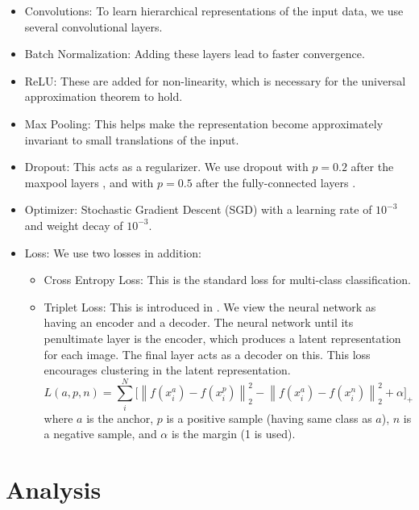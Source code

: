 \documentclass{article}
\newcommand{\norm}[1]{\left\lVert#1\right\rVert}
\begin{document}
\begin{sloppypar}
        \begin{itemize}
            \item Convolutions: To learn hierarchical representations of the input data, we use several convolutional layers.
            \item Batch Normalization: Adding these layers lead to faster convergence.
            \item ReLU: These are added for non-linearity, which is necessary for the universal approximation theorem to hold.
            \item Max Pooling: This helps make the representation become approximately invariant to small translations of the input.
            \item Dropout: This acts as a regularizer. We use dropout with $p=0.2$ after the maxpool layers \cite{dropout_analysis}, and with $p=0.5$ after the fully-connected layers \cite{dropout_hinton}.
            \item Optimizer: Stochastic Gradient Descent (SGD) with a learning rate of $10^{-3}$ and weight decay of $10^{-3}$.
            \item Loss: We use two losses in addition:
                \begin{itemize}
                    \item Cross Entropy Loss: This is the standard loss for multi-class classification.
                    \item Triplet Loss: This is introduced in \cite{facenet}. We view the neural network as having an encoder and a decoder. The neural network until its penultimate layer is the encoder, which produces a latent representation for each image. The final layer acts as a decoder on this. This loss encourages clustering in the latent representation.
                    $$L(a,p,n) = \sum_i^N \big[\norm{f(x_i^a)-f(x_i^p)}_2^2-\norm{f(x_i^a)-f(x_i^n)}_2^2+\alpha\big]_+$$ where $a$ is the anchor, $p$ is a positive sample (having same class as $a$), $n$ is a negative sample, and $\alpha$ is the margin (1 is used).
                \end{itemize}
        \end{itemize}

    \section{Analysis}


\end{sloppypar}
\end{document}
